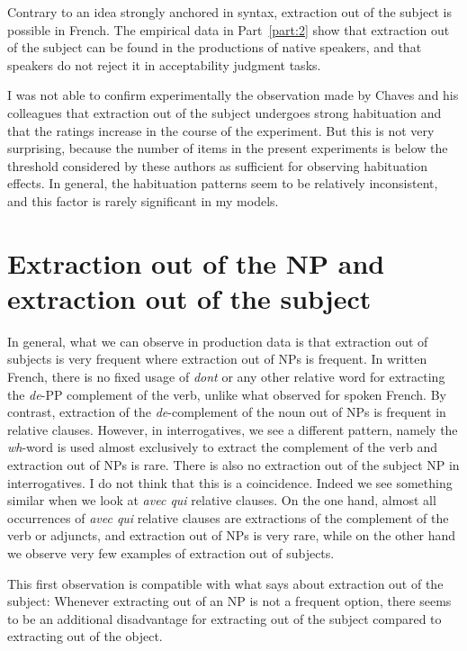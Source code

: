 Contrary to an idea strongly anchored in syntax, extraction out of the subject is possible in French. The empirical data in Part~\ref{part:2} show that extraction out of the subject can be found in the productions of native speakers, and that speakers do not reject it in acceptability judgment tasks.

I was not able to confirm experimentally the observation made by Chaves and his colleagues \citep{Chaves.2014,Chaves.2019.Frequency,Chaves.2020.UDC} that extraction out of the subject undergoes strong habituation and that the ratings increase in the course of the experiment. But this is not very surprising, because the number of items in the present experiments is below the threshold considered by these authors as sufficient for observing habituation effects. In general, the habituation patterns seem to be relatively inconsistent, and this factor is rarely significant in my models. 

\section{Extraction out of the NP and extraction out of the subject}

In general, what we can observe in production data is that extraction out of subjects is very frequent where extraction out of NPs is frequent. In written French, there is no fixed usage of \textit{dont} or any other relative word for extracting the \textit{de}-PP complement of the verb, unlike what  \citet{Blanche-Benveniste.1990} observed for spoken French. 
By contrast, extraction of the \textit{de}-complement of the noun out of NPs is frequent in relative clauses. However, in interrogatives, we see a different pattern, namely the \textit{wh}-word is used almost exclusively to extract the complement of the verb and extraction out of NPs is rare. There is also no extraction out of the subject NP in interrogatives. I do not think that this is a coincidence. Indeed we see something similar when we look at \emph{avec qui} relative clauses. On the one hand, almost all occurrences of \emph{avec qui} relative clauses are extractions of the complement of the verb or adjuncts, and extraction out of NPs is very rare, while on the other hand we observe very few examples of extraction out of subjects. 

This first observation is compatible with what \citet{Kluender.2004} says about extraction out of the subject: Whenever extracting out of an NP is not a frequent option, there seems to be an additional disadvantage for extracting out of the subject compared to extracting out of the object.

